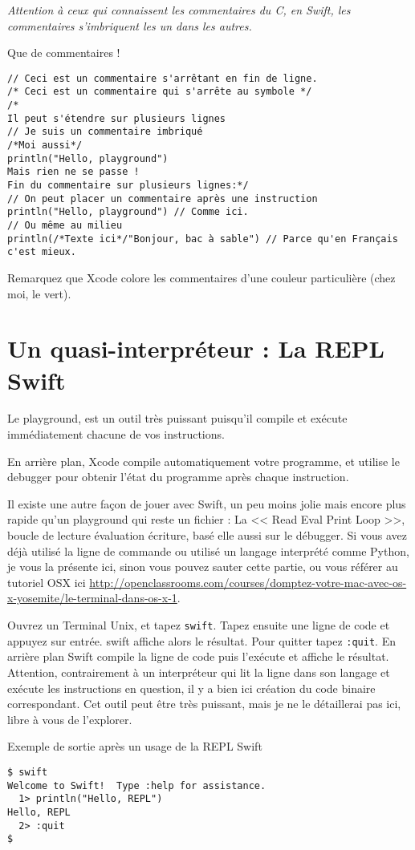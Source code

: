 \emph{Attention à ceux qui connaissent les commentaires du C, en Swift, les commentaires
s'imbriquent les un dans les autres.}

\begin{listing}[h]
\caption{Que de commentaires !}
\begin{verbatim}
// Ceci est un commentaire s'arrêtant en fin de ligne.
/* Ceci est un commentaire qui s'arrête au symbole */
/*
Il peut s'étendre sur plusieurs lignes
// Je suis un commentaire imbriqué
/*Moi aussi*/
println("Hello, playground")
Mais rien ne se passe !
Fin du commentaire sur plusieurs lignes:*/
// On peut placer un commentaire après une instruction
println("Hello, playground") // Comme ici.
// Ou même au milieu
println(/*Texte ici*/"Bonjour, bac à sable") // Parce qu'en Français c'est mieux.
\end{verbatim}
\end{listing}
Remarquez que Xcode colore les commentaires d'une couleur particulière (chez moi, le vert).
\section{Un quasi-interpréteur : La REPL Swift}
Le playground, est un outil très puissant puisqu’il compile et exécute immédiatement
chacune de vos instructions.

En arrière plan, Xcode compile automatiquement votre programme, et utilise le debugger
pour obtenir l’état du programme après chaque instruction.

Il existe une autre façon de jouer avec Swift, un peu moins jolie mais encore plus rapide
qu’un playground qui reste un fichier : La << Read Eval Print Loop >>, boucle de lecture évaluation écriture, basé elle aussi sur le
débugger. Si vous avez déjà utilisé la ligne de commande ou utilisé un langage interprété
comme Python, je vous la présente ici, sinon vous pouvez sauter cette partie, ou vous
référer au tutoriel OSX ici \url{http://openclassrooms.com/courses/domptez-votre-mac-avec-os-x-yosemite/le-terminal-dans-os-x-1}.

Ouvrez un Terminal Unix, et tapez \verb"swift".
Tapez ensuite une ligne de code et appuyez sur entrée.
swift affiche alors le résultat.
Pour quitter tapez \verb":quit".
En arrière plan Swift compile la ligne de code puis l'exécute et affiche le résultat.
Attention, contrairement à un interpréteur qui lit la ligne dans son langage et exécute
les instructions en question, il y a bien ici création du code binaire correspondant.
Cet outil peut être très puissant, mais je ne le détaillerai pas ici, libre à vous de l’explorer.
\begin{listing}[h]
\caption{Exemple de sortie après un usage de la REPL Swift}
\begin{verbatim}
$ swift
Welcome to Swift!  Type :help for assistance.
  1> println("Hello, REPL")
Hello, REPL
  2> :quit
$
\end{verbatim}
\end{listing}